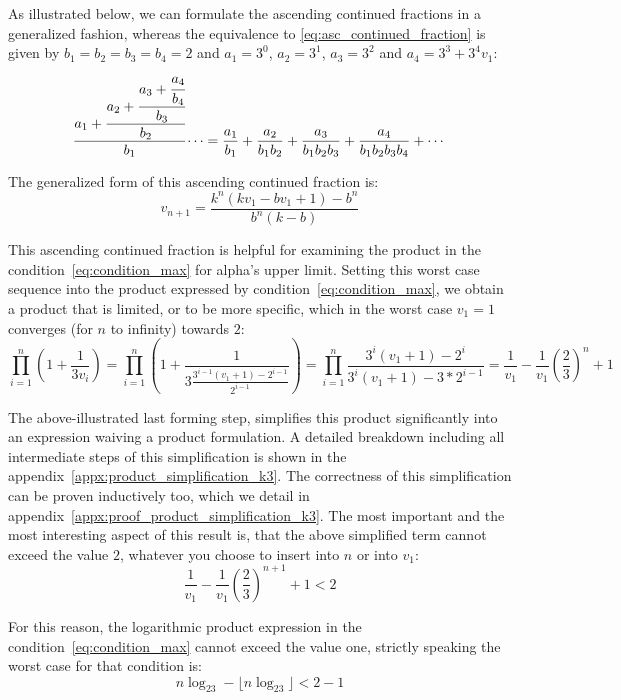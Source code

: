 \par\noindent
As illustrated below, we can formulate the ascending continued fractions in a generalized fashion, whereas the equivalence to \ref{eq:asc_continued_fraction} is given by $b_1=b_2=b_3=b_4=2$ and $a_1=3^0$, $a_2=3^1$, $a_3=3^2$ and $a_4=3^3+3^4v_1$:
\[
\cfrac{a_1+\cfrac{a_2+\cfrac{a_3+\cfrac{a_4}{b_4}}{b_3}}{b_2}}{b_1}\dotsb=\frac{a_1}{b_1}+\frac{a_2}{b_1b_2}+\frac{a_3}{b_1b_2b_3}+\frac{a_4}{b_1b_2b_3b_4}+\cdots
\]

The generalized form of this ascending continued fraction is:
\begin{equation}
\label{eq:generalized_asc_continued_fraction}
v_{n+1}=\frac{k^n(kv_1-bv_1+1)-b^n}{b^n(k-b)}
\end{equation}

\par\medskip
This ascending continued fraction is helpful for examining the product in the condition~\ref{eq:condition_max} for alpha's upper limit. Setting this worst case sequence into the product expressed by condition~\ref{eq:condition_max}, we obtain a product that is limited, or to be more specific, which in the worst case $v_1=1$ converges (for $n$ to infinity) towards $2$:
\begin{equation}
\label{eq:product_simplification_k3}
\prod_{i=1}^{n}\left(1+\frac{1}{3v_{i}}\right)
=\prod_{i=1}^{n}\left(1+\frac{1}{3\frac{3^{i-1}(v_1+1)-2^{i-1}}{2^{i-1}}}\right)
=\prod_{i=1}^{n}\frac{3^i(v_1+1)-2^i}{3^i(v_1+1)-3*2^{i-1}}
=\frac{1}{v_1}-\frac{1}{v_1}\left(\frac{2}{3}\right)^n+1
\end{equation}

The above-illustrated last forming step, simplifies this product significantly into an expression waiving a product formulation. A detailed breakdown including all intermediate steps of this simplification is shown in the appendix~\ref{appx:product_simplification_k3}. The correctness of this simplification can be proven inductively too, which we detail in appendix~\ref{appx:proof_product_simplification_k3}. The most important and the most interesting aspect of this result is, that the above simplified term cannot exceed the value $2$, whatever you choose to insert into $n$ or into $v_1$:
\[
\frac{1}{v_1}-\frac{1}{v_1}\left(\frac{2}{3}\right)^{n+1}+1<2
\]

For this reason, the logarithmic product expression in the condition~\ref{eq:condition_max} cannot exceed the value one, strictly speaking the worst case for that condition is:
\[
n\log_23-\lfloor n\log_23\rfloor<2-1
\]

